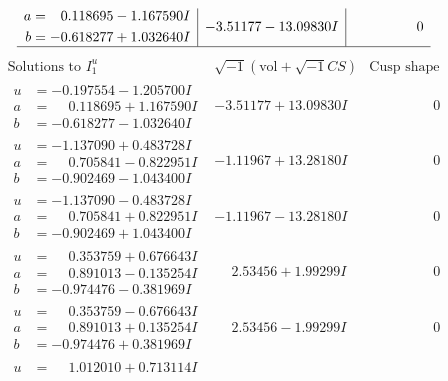 \documentclass[1p]{elsarticle_modified}
\theoremstyle{definition}
\newcommand{\I}{\sqrt{-1}}
\begin{document}
$$\begin{array}{c|c|c}
\begin{aligned}
a &= \phantom{-}0.118695 - 1.167590 I \\
b &= -0.618277 + 1.032640 I\end{aligned}
 & -3.51177 - 13.09830 I & \phantom{-0.000000 } 0\\
 \hline 
 \end{array}$$\newpage$$\begin{array}{c|c|c}  
\text{Solutions to }I^u_{1}& \I (\text{vol} + \sqrt{-1}CS) & \text{Cusp shape}\\
 \hline 
\begin{aligned}
u &= -0.197554 - 1.205700 I \\
a &= \phantom{-}0.118695 + 1.167590 I \\
b &= -0.618277 - 1.032640 I\end{aligned}
 & -3.51177 + 13.09830 I & \phantom{-0.000000 } 0 \\ \hline\begin{aligned}
u &= -1.137090 + 0.483728 I \\
a &= \phantom{-}0.705841 - 0.822951 I \\
b &= -0.902469 - 1.043400 I\end{aligned}
 & -1.11967 + 13.28180 I & \phantom{-0.000000 } 0 \\ \hline\begin{aligned}
u &= -1.137090 - 0.483728 I \\
a &= \phantom{-}0.705841 + 0.822951 I \\
b &= -0.902469 + 1.043400 I\end{aligned}
 & -1.11967 - 13.28180 I & \phantom{-0.000000 } 0 \\ \hline\begin{aligned}
u &= \phantom{-}0.353759 + 0.676643 I \\
a &= \phantom{-}0.891013 - 0.135254 I \\
b &= -0.974476 - 0.381969 I\end{aligned}
 & \phantom{-}2.53456 + 1.99299 I & \phantom{-0.000000 } 0 \\ \hline\begin{aligned}
u &= \phantom{-}0.353759 - 0.676643 I \\
a &= \phantom{-}0.891013 + 0.135254 I \\
b &= -0.974476 + 0.381969 I\end{aligned}
 & \phantom{-}2.53456 - 1.99299 I & \phantom{-0.000000 } 0 \\ \hline\begin{aligned}
u &= \phantom{-}1.012010 + 0.713114 I \\

\end{aligned}
\end{array}$$
\end{document}
